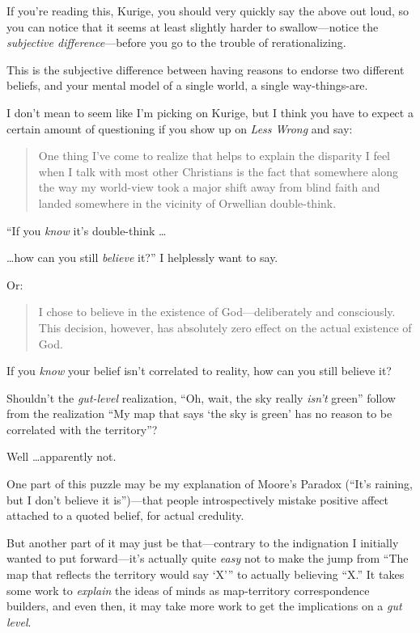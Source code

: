 {
 If you're reading this, Kurige, you should very
quickly say the above out loud, so you can notice that it seems at
least slightly harder to swallow---notice the \textit{subjective
difference}{}---before you go to the trouble of rerationalizing.}

{
 This is the subjective difference between having reasons to
endorse two different beliefs, and your mental model of a single world,
a single way-things-are.}

\myendsectiontext


{
 I don't mean to seem like I'm
picking on Kurige, but I think you have to expect a certain amount of
questioning if you show up on \textit{Less Wrong} and say:}

\begin{quote}
{
 One thing I've come to realize that helps to
explain the disparity I feel when I talk with most other Christians is
the fact that somewhere along the way my world-view took a major shift
away from blind faith and landed somewhere in the vicinity of Orwellian
double-think.}
\end{quote}

{
 ``If you \textit{know} it's
double-think \ldots}

{
 \ldots how can you still \textit{believe} it?'' I
helplessly want to say.}

{
 Or:}

\begin{quote}
{
 I chose to believe in the existence of God---deliberately and
consciously. This decision, however, has absolutely zero effect on the
actual existence of God.}
\end{quote}

{
 If you \textit{know} your belief isn't correlated
to reality, how can you still believe it?}

{
 Shouldn't the \textit{gut-level} realization,
``Oh, wait, the sky really
\textit{isn't} green'' follow from
the realization ``My map that says `the
sky is green' has no reason to be correlated with the
territory''?}

{
 Well \ldots apparently not.}

{
 One part of this puzzle may be my explanation of
Moore's Paradox
(``It's raining, but I
don't believe it is'')---that people
introspectively mistake positive affect attached to a quoted belief,
for actual credulity.}

{
 But another part of it may just be that---contrary to the
indignation I initially wanted to put forward---it's
actually quite \textit{easy} not to make the jump from
``The map that reflects the territory would say
`X''' to actually
believing ``X.'' It takes some work
to \textit{explain} the ideas of minds as map-territory correspondence
builders, and even then, it may take more work to get the implications
on a \textit{gut level}.}

